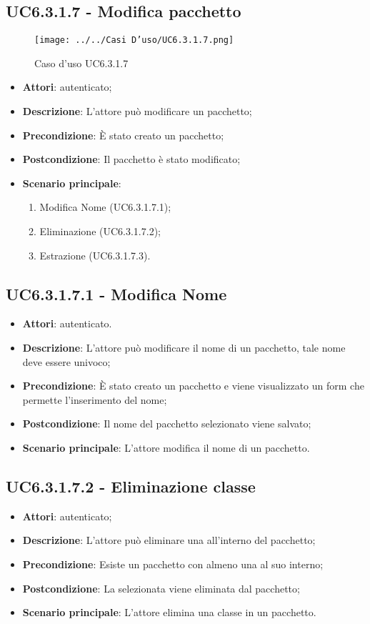 \subsection{UC6.3.1.7 - Modifica pacchetto}
\label{ssec:UC6.3.1.7}
\begin{figure}[h!]
\centering
\texttt{[image: ../../Casi D'uso/UC6.3.1.7.png]}
\caption{Caso d'uso UC6.3.1.7}
 \end{figure}
\begin{itemize}
\item \textbf{Attori}:  autenticato;
\item \textbf{Descrizione}: L'attore può modificare un pacchetto;
\item \textbf{Precondizione}: È stato creato un pacchetto;
\item \textbf{Postcondizione}: Il pacchetto è stato modificato;
\item \textbf{Scenario principale}: \begin{enumerate}\item Modifica Nome (UC6.3.1.7.1);\item Eliminazione  (UC6.3.1.7.2);\item Estrazione  (UC6.3.1.7.3).
 \end{enumerate}
\end{itemize}
\subsection{UC6.3.1.7.1 - Modifica Nome}
\label{ssec:UC6.3.1.7.1}
\begin{itemize}
\item \textbf{Attori}:  autenticato.
\item \textbf{Descrizione}: L'attore può modificare il nome di un pacchetto, tale nome deve essere univoco;
\item \textbf{Precondizione}: È stato creato un pacchetto e viene visualizzato un form che permette l'inserimento del nome;
\item \textbf{Postcondizione}: Il nome del pacchetto selezionato viene salvato;
\item \textbf{Scenario principale}: L'attore modifica il nome di un pacchetto.
\end{itemize}
\subsection{UC6.3.1.7.2 - Eliminazione classe}
\label{ssec:UC6.3.1.7.2}
\begin{itemize}
\item \textbf{Attori}:  autenticato;
\item \textbf{Descrizione}: L'attore può eliminare una  all'interno del pacchetto;
\item \textbf{Precondizione}: Esiste un pacchetto con almeno una  al suo interno;
\item \textbf{Postcondizione}: La  selezionata viene eliminata dal pacchetto;
\item \textbf{Scenario principale}: L'attore elimina una classe in un pacchetto.
\end{itemize}
